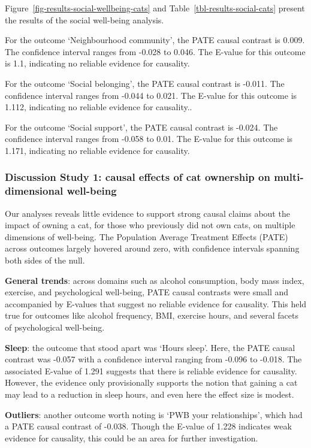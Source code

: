\documentclass[
  singlecolumn,
  9pt]{article}
\begin{document}
Figure~\ref{fig-results-social-wellbeing-cats} and
Table~\ref{tbl-results-social-cats} present the results of the social
well-being analysis.

For the outcome `Neighbourhood community', the PATE causal contrast is
0.009. The confidence interval ranges from -0.028 to 0.046. The E-value
for this outcome is 1.1, indicating no reliable evidence for causality.

For the outcome `Social belonging', the PATE causal contrast is -0.011.
The confidence interval ranges from -0.044 to 0.021. The E-value for
this outcome is 1.112, indicating no reliable evidence for causality..

For the outcome `Social support', the PATE causal contrast is -0.024.
The confidence interval ranges from -0.058 to 0.01. The E-value for this
outcome is 1.171, indicating no reliable evidence for causality.

\subsubsection{Discussion Study 1: causal effects of cat ownership on
multi-dimensional
well-being}\label{discussion-study-1-causal-effects-of-cat-ownership-on-multi-dimensional-well-being}

Our analyses reveals little evidence to support strong causal claims
about the impact of owning a cat, for those who previously did not own
cats, on multiple dimensions of well-being. The Population Average
Treatment Effects (PATE) across outcomes largely hovered around zero,
with confidence intervals spanning both sides of the null.

\textbf{General trends}: across domains such as alcohol consumption,
body mass index, exercise, and psychological well-being, PATE causal
contrasts were small and accompanied by E-values that suggest no
reliable evidence for causality. This held true for outcomes like
alcohol frequency, BMI, exercise hours, and several facets of
psychological well-being.

\textbf{Sleep}: the outcome that stood apart was `Hours sleep'. Here,
the PATE causal contrast was -0.057 with a confidence interval ranging
from -0.096 to -0.018. The associated E-value of 1.291 suggests that
there is reliable evidence for causality. However, the evidence only
provisionally supports the notion that gaining a cat may lead to a
reduction in sleep hours, and even here the effect size is modest.

\textbf{Outliers}: another outcome worth noting is `PWB your
relationships', which had a PATE causal contrast of -0.038. Though the
E-value of 1.228 indicates weak evidence for causality, this could be an
area for further investigation.
\end{document}
